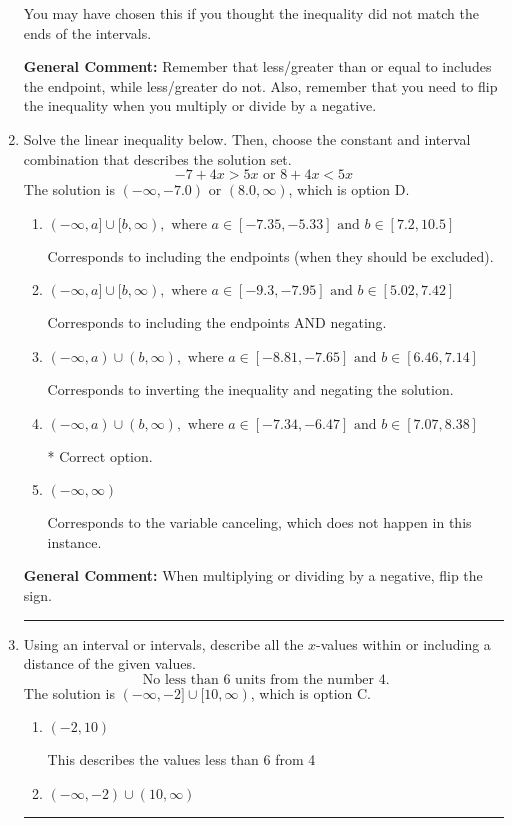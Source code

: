 \documentclass{extbook}[14pt]
\newcommand{\litem}[1]{\item #1

\rule{\textwidth}{0.4pt}}
\begin{document}
\begin{enumerate}
{\begin{enumerate}[label=\Alph*.]
You may have chosen this if you thought the inequality did not match the ends of the intervals.
\end{enumerate}

\textbf{General Comment:} Remember that less/greater than or equal to includes the endpoint, while less/greater do not. Also, remember that you need to flip the inequality when you multiply or divide by a negative.
}
\litem{
Solve the linear inequality below. Then, choose the constant and interval combination that describes the solution set.
\[ -7 + 4 x > 5 x \text{ or } 8 + 4 x < 5 x \]The solution is \( (-\infty, -7.0) \text{ or } (8.0, \infty) \), which is option D.\begin{enumerate}[label=\Alph*.]
\item \( (-\infty, a] \cup [b, \infty), \text{ where } a \in [-7.35, -5.33] \text{ and } b \in [7.2, 10.5] \)

Corresponds to including the endpoints (when they should be excluded).
\item \( (-\infty, a] \cup [b, \infty), \text{ where } a \in [-9.3, -7.95] \text{ and } b \in [5.02, 7.42] \)

Corresponds to including the endpoints AND negating.
\item \( (-\infty, a) \cup (b, \infty), \text{ where } a \in [-8.81, -7.65] \text{ and } b \in [6.46, 7.14] \)

Corresponds to inverting the inequality and negating the solution.
\item \( (-\infty, a) \cup (b, \infty), \text{ where } a \in [-7.34, -6.47] \text{ and } b \in [7.07, 8.38] \)

 * Correct option.
\item \( (-\infty, \infty) \)

Corresponds to the variable canceling, which does not happen in this instance.
\end{enumerate}

\textbf{General Comment:} When multiplying or dividing by a negative, flip the sign.
}
\litem{
Using an interval or intervals, describe all the $x$-values within or including a distance of the given values.
\[ \text{ No less than } 6 \text{ units from the number } 4. \]The solution is \( (-\infty, -2] \cup [10, \infty) \), which is option C.\begin{enumerate}[label=\Alph*.]
\item \( (-2, 10) \)

This describes the values less than 6 from 4
\item \( (-\infty, -2) \cup (10, \infty) \)


\end{enumerate}}
\end{enumerate}
\end{document}
